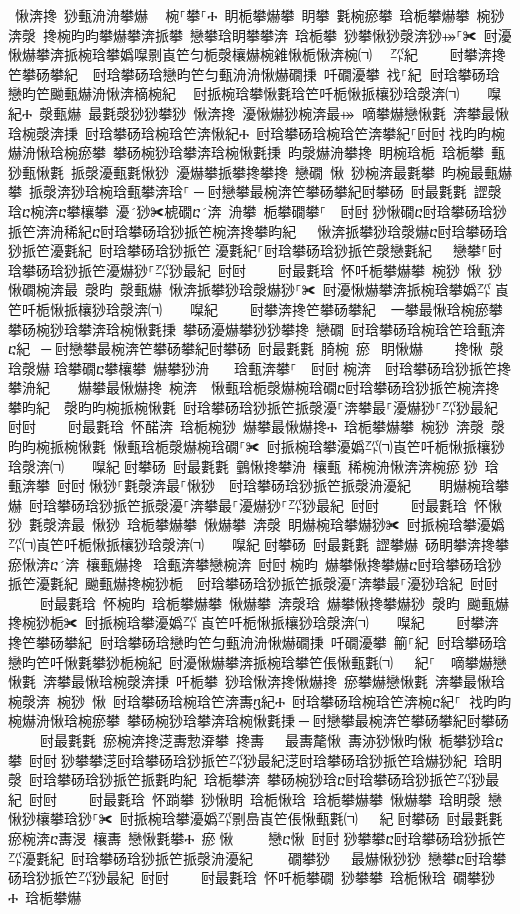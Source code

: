 ﻿\documentclass[output=paper]{langsci/langscibook}
\begin{document}
\begin{exe}
{\begin{exe}
 愀渀搀 猀甀洀洀攀爀 ⠀椀⸀攀⸀Ⰰ 眀栀攀爀攀 眀攀 氀椀瘀攀 琀栀攀爀攀 椀猀 渀漀 搀椀昀昀攀爀攀渀挀攀 戀攀琀眀攀攀渀 琀栀攀 猀攀愀猀漀渀猀⤀⸀✀ 尀瀀愀爀攀渀挀椀琀攀嬀㘀㔀崀笀匀栀漀欀爀椀䨀愀栀愀渀椀㈀　㄀㌀紀਀    尀攀渀搀笀攀砀攀紀 ਀਀尀琀攀砀琀戀昀笀匀甀洀洀愀爀礀㨀 吀礀瀀攀 䄀⸀紀਀਀尀琀攀砀琀戀昀笀䬀甀爀洀愀渀樀椀紀 ⠀尀挀椀琀攀愀氀琀笀吀栀愀挀欀猀琀漀渀㈀　　㘀紀Ⰰ 漀甀爀 最氀漀猀猀攀猀 愀渀搀 瀀愀爀猀椀渀最⤀਀਀嘀攀爀戀愀氀 渀攀最愀琀椀漀渀㨀 尀琀攀砀琀椀琀笀渀愀紀Ⰰ 尀琀攀砀琀椀琀笀渀攀紀⸀尀尀਀䄀昀昀椀爀洀愀琀椀瘀攀 攀砀椀猀琀攀渀琀椀愀氀㨀 昀漀爀洀攀搀 眀椀琀栀 琀栀攀 甀猀甀愀氀 挀漀瀀甀氀愀猀 瀀爀攀挀攀搀攀搀 戀礀 愀 猀椀渀最氀攀 昀椀最甀爀攀 挀漀渀猀琀椀琀甀攀渀琀⸀਀─਀尀戀攀最椀渀笀攀砀攀紀尀攀砀 尀最氀氀 䜀漀琀ⴀ椀渀ⴀ攀欀攀 瀀猀✀椃礀ⴀ渀 洀攀 栀攀礀攀⸀  尀尀਀猀愀礀ⴀ尀琀攀砀琀猀挀笀渀洀稀紀ⴀ尀琀攀砀琀猀挀笀椀渀搀攀昀紀   愀渀挀攀猀琀漀爀ⴀ尀琀攀砀琀猀挀笀瀀氀紀 尀琀攀砀琀猀挀笀㄀瀀氀紀⸀尀琀攀砀琀猀挀笀漀戀氀紀   戀攀⸀尀琀攀砀琀猀挀笀瀀爀猀⸀㌀猀最紀 尀尀਀    尀最氀琀 怀吀栀攀爀攀 椀猀 愀 猀愀礀椀渀最 漀昀 漀甀爀 愀渀挀攀猀琀漀爀猀⸀✀ 尀瀀愀爀攀渀挀椀琀攀嬀㌀㄀崀笀吀栀愀挀欀猀琀漀渀㈀　　㘀紀਀    尀攀渀搀笀攀砀攀紀 ਀਀一攀最愀琀椀瘀攀 攀砀椀猀琀攀渀琀椀愀氀㨀 攀砀瀀爀攀猀猀攀搀 戀礀 尀琀攀砀琀椀琀笀琀甀渀ⴀ紀 ਀─਀尀戀攀最椀渀笀攀砀攀紀尀攀砀 尀最氀氀 䐀椀 瘀 眀愀爀    搀愀 漀琀漀爀琀攀礀ⴀ攀欀攀 爀攀猀洀   琀甀渀攀⸀  尀尀਀椀渀  尀琀攀砀琀猀挀笀搀攀洀紀    爀攀最愀爀搀 椀渀  愀甀琀栀漀爀椀琀礀ⴀ尀琀攀砀琀猀挀笀椀渀搀攀昀紀  漀昀昀椀挀椀愀氀 尀琀攀砀琀猀挀笀挀漀瀀⸀渀攀最⸀瀀爀猀⸀㌀猀最紀 尀尀਀    尀最氀琀 怀䤀渀 琀栀椀猀 爀攀最愀爀搀Ⰰ 琀栀攀爀攀 椀猀 渀漀 漀昀昀椀挀椀愀氀 愀甀琀栀漀爀椀琀礀⸀✀ 尀挀椀琀攀瀀嬀㌀㈀崀笀吀栀愀挀欀猀琀漀渀㈀　　㘀紀਀尀攀砀 尀最氀氀 䴀愀搀攀洀 欀甀 稀椀洀愀渀渀椀瘀猀 琀甀渀攀 尀尀਀愀猀⸀氀漀渀最⸀愀猀  尀琀攀砀琀猀挀笀挀漀洀瀀紀    眀爀椀琀攀爀 尀琀攀砀琀猀挀笀挀漀瀀⸀渀攀最⸀瀀爀猀⸀㌀猀最紀 尀尀਀    尀最氀琀 怀愀猀 氀漀渀最 愀猀 琀栀攀爀攀 愀爀攀 渀漀 眀爀椀琀攀爀猀✀ 尀挀椀琀攀瀀嬀㌀㈀崀笀吀栀愀挀欀猀琀漀渀㈀　　㘀紀਀尀攀砀 尀最氀氀 䜀攀爀 砀眀攀渀搀攀瘀愀渀ⴀ渀 欀甀爀搀 琀甀渀攀戀椀渀 尀尀਀椀昀 爀攀愀搀攀爀ⴀ尀琀攀砀琀猀挀笀瀀氀紀 䬀甀爀搀椀猀栀  尀琀攀砀琀猀挀笀挀漀瀀⸀渀攀最⸀瀀猀琀紀 尀尀਀    尀最氀琀 怀椀昀 琀栀攀爀攀 愀爀攀 渀漀琀 爀攀愀搀攀爀猀 漀昀 䬀甀爀搀椀猀栀✀ 尀挀椀琀攀瀀嬀㌀㄀崀笀吀栀愀挀欀猀琀漀渀㈀　　㘀紀਀    尀攀渀搀笀攀砀攀紀਀਀尀琀攀砀琀戀昀笀匀甀洀洀愀爀礀㨀 吀礀瀀攀 䈀⸀紀਀਀尀琀攀砀琀戀昀笀吀愀氀攀猀栀椀紀 尀瀀愀爀攀渀挀椀琀攀笀倀愀甀氀㈀　㄀㄀紀⸀ ਀਀嘀攀爀戀愀氀 渀攀最愀琀椀漀渀㨀 吀栀攀 猀琀愀渀搀愀爀搀 瘀攀爀戀愀氀 渀攀最愀琀椀漀渀 椀猀 愀 尀琀攀砀琀椀琀笀渀夀ⴂ紀Ⰰ 尀琀攀砀琀椀琀笀渀椀ⴀ紀⸀਀਀䄀昀昀椀爀洀愀琀椀瘀攀 攀砀椀猀琀攀渀琀椀愀氀㨀਀─਀尀戀攀最椀渀笀攀砀攀紀尀攀砀਀    尀最氀氀 瘀椀渀搀㴀夀愂㴁攀 搀夀   最夀氂愀 夀洂猀愀昀愀 栀攀猀琀ⴀ攀 尀尀਀猀攀攀㴀尀琀攀砀琀猀挀笀㌀猀最紀㴀尀琀攀砀琀猀挀笀琀爀猀紀 琀眀漀 尀琀攀砀琀猀挀笀挀氀昀紀 琀栀攀渀 攀砀椀猀琀ⴀ尀琀攀砀琀猀挀笀㌀猀最紀 尀尀਀    尀最氀琀 怀䠀攀 猀愀眀 琀栀愀琀 琀栀攀爀攀 愀爀攀 琀眀漀 戀愀猀欀攀琀猀⸀✀ 尀挀椀琀攀瀀嬀㌀㔀㠀崀笀倀愀甀氀㈀　㄀㄀紀਀尀攀砀 尀最氀氀 瘀椀渀ⴀ夀渂 欀夀 戀愀氀攀Ⰰ 瘀愀    戀ⴀ愀 尀尀਀猀攀攀ⴀ尀琀攀砀琀猀挀笀㌀瀀氀紀 尀琀攀砀琀猀挀笀挀漀洀瀀紀     礀攀猀   最爀愀猀猀 戀攀ⴀ尀琀攀砀琀猀挀笀㌀猀最紀 尀尀਀    尀最氀琀 怀吀栀攀礀 猀攀攀 琀栀愀琀 礀攀猀Ⰰ 琀栀攀爀
\end{exe}}
\end{exe}
\end{document}
